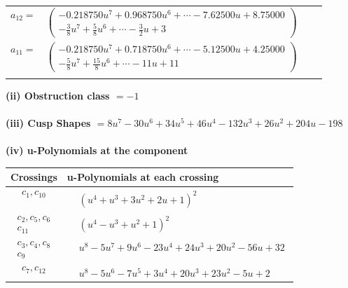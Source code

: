 \documentclass[1p]{elsarticle_modified}
\theoremstyle{definition}
\begin{document}
\begin{tabular}{m{7pt} m{180pt} m{7pt} m{180pt} }
\flushright $a_{12}=$&$\begin{pmatrix}-0.218750 u^{7}+0.968750 u^{6}+\cdots-7.62500 u+8.75000\\-\frac{3}{8} u^7+\frac{5}{8} u^6+\cdots-\frac{3}{2} u+3\end{pmatrix}$ \\
\flushright $a_{11}=$&$\begin{pmatrix}-0.218750 u^{7}+0.718750 u^{6}+\cdots-5.12500 u+4.25000\\-\frac{5}{8} u^7+\frac{15}{8} u^6+\cdots-11 u+11\end{pmatrix}$\\&\end{tabular}
\flushleft \textbf{(ii) Obstruction class $= -1$}\\~\\
\flushleft \textbf{(iii) Cusp Shapes $= 8 u^7-30 u^6+34 u^5+46 u^4-132 u^3+26 u^2+204 u-198$}\\~\\
\newpage\renewcommand{\arraystretch}{1}
\flushleft \textbf{(iv) u-Polynomials at the component}\newline \\
\begin{tabular}{m{50pt}|m{274pt}}
Crossings & \hspace{64pt}u-Polynomials at each crossing \\
\hline $$\begin{aligned}c_{1},c_{10}\end{aligned}$$&$\begin{aligned}
&(u^4+u^3+3 u^2+2 u+1)^2
\end{aligned}$\\
\hline $$\begin{aligned}c_{2},c_{5},c_{6}\\c_{11}\end{aligned}$$&$\begin{aligned}
&(u^4- u^3+u^2+1)^2
\end{aligned}$\\
\hline $$\begin{aligned}c_{3},c_{4},c_{8}\\c_{9}\end{aligned}$$&$\begin{aligned}
&u^8-5 u^7+9 u^6-23 u^4+24 u^3+20 u^2-56 u+32
\end{aligned}$\\
\hline $$\begin{aligned}c_{7},c_{12}\end{aligned}$$&$\begin{aligned}
&u^8-5 u^6-7 u^5+3 u^4+20 u^3+23 u^2-5 u+2
\end{aligned}$\\
\hline
\end{tabular}\\~\\
\end{document}
